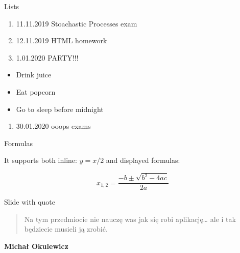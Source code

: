 \documentclass[
  ignorenonframetext,
]{beamer}
\providecommand{\tightlist}{%
  \setlength{\itemsep}{0pt}\setlength{\parskip}{0pt}}
\begin{document}
\begin{frame}{Lists}
\protect\hypertarget{lists}{}

\begin{enumerate}
\tightlist
\item
  11.11.2019 Stoachastic Processes exam
\item
  12.11.2019 HTML homework
\item
  1.01.2020 PARTY!!!
\end{enumerate}

\begin{itemize}
\tightlist
\item
  Drink juice
\item
  Eat popcorn
\item
  Go to sleep before midnight
\end{itemize}

\begin{enumerate}
\tightlist
\item
  30.01.2020 ooops exams
\end{enumerate}

\end{frame}

\begin{frame}{Formulas}
\protect\hypertarget{formulas}{}

It supports both inline: \(y = x / 2\) and displayed formulas:

\[ x_{1,2} = \frac{- b \pm \sqrt{b^2 - 4ac}}{2a} \]

\end{frame}

\begin{frame}{Slide with quote}
\protect\hypertarget{slide-with-quote}{}

\begin{quote}
Na tym przedmiocie nie nauczę was jak się robi aplikację\ldots{} ale i
tak będziecie musieli ją zrobić.
\end{quote}

\textbf{Michał Okulewicz}

\end{frame}
\end{document}

